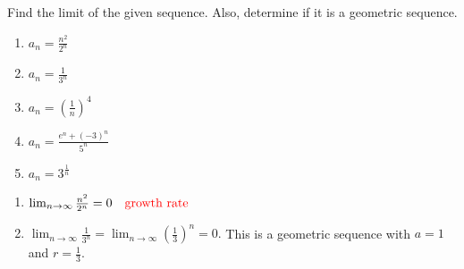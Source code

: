 \documentclass[noinstructornotes]{ximera}
\begin{document}
\begin{problem}
\begin{enumerate}
\begin{problem}
Find the limit of the given sequence.  
Also, determine if it is a geometric sequence.
	\begin{multicols}{3}
	\begin{enumerate}
	
	\item  $a_n = \frac{n^2}{2^n}$
	
	
	
	
	\item  $a_n = \frac{1}{3^n}$
	
	
	
	
	\item  $a_n = \left( \frac{1}{n} \right)^4$
	
	
	
	
	\item  $a_n = \frac{e^n + (-3)^n}{5^n}$
	
	
	
	
	\item  $a_n = 3^{\frac{1}{n}}$
	
	
	\end{enumerate}
	\end{multicols}
	
	\begin{freeResponse}
	\begin{enumerate}
	\item 	$\lim_{n \to \infty} \frac{n^2}{2^n} = 0 	\quad	{\color{red}\text{growth rate}}$
	
	\item  $\lim_{n \to \infty} \frac{1}{3^n} = \lim_{n \to \infty} \left( \frac{1}{3} \right)^n = 0.$
	This is a geometric sequence with $a = 1$ and $r = \frac{1}{3}$.  
	

\end{enumerate}
\end{freeResponse}
\end{problem}
\end{enumerate}
\end{problem}
\end{document}
